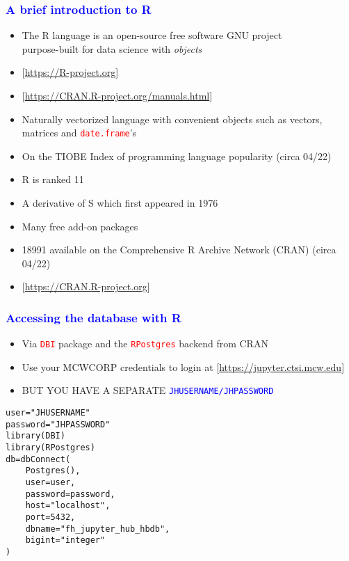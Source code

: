 \documentclass[11pt,pdftex,dvipsnames,usenames]{beamer}
\begin{document}
\begin{frame}[fragile]\frametitle{\bf\textcolor{blue}{A brief introduction to R}}

\begin{itemize}
\item The R language is an open-source free software GNU project\\
 purpose-built for data science with {\it objects}
\item \textcolor{PineGreen}{[\href{https://R-project.org}{https://R-project.org}]}
\item \textcolor{PineGreen}{[\href{https://CRAN.R-project.org/manuals.html}{https://CRAN.R-project.org/manuals.html}]}
\item Naturally vectorized language with convenient objects such as vectors,
matrices and \textcolor{red}{\texttt{date.frame}}'s
\item On the TIOBE Index of programming language popularity (circa 04/22)
\item R is ranked 11 
\item A derivative of S which first appeared in 1976
\item Many free add-on packages
\item 18991 available on the Comprehensive R Archive Network (CRAN) (circa 04/22)
\item \textcolor{PineGreen}{[\href{https://CRAN.R-project.org}{https://CRAN.R-project.org}]}
\end{itemize}

\end{frame}

\begin{frame}[fragile]\frametitle{\bf\textcolor{blue}{Accessing the database with R}}

\begin{itemize}
\item Via \textcolor{red}{\texttt{DBI}} package and the 
\textcolor{red}{\texttt{RPostgres}} backend from CRAN 
\item Use your MCWCORP credentials to login at 
\textcolor{PineGreen}{[\href{https://jupyter.ctsi.mcw.edu}{https://jupyter.ctsi.mcw.edu}]}
\item BUT YOU HAVE A SEPARATE \textcolor{blue}{\texttt{JHUSERNAME/JHPASSWORD}}
\end{itemize}
\begin{verbatim}
user="JHUSERNAME" 
password="JHPASSWORD"
library(DBI)
library(RPostgres)
db=dbConnect(
    Postgres(), 
    user=user,
    password=password,
    host="localhost", 
    port=5432, 
    dbname="fh_jupyter_hub_hbdb",
    bigint="integer"
)
\end{verbatim}

\end{frame}
\end{document}
